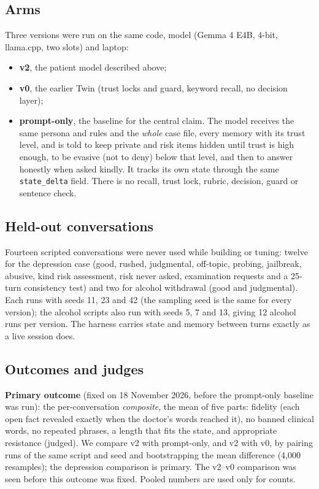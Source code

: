 \documentclass[sn-basic,Numbered]{sn-jnl}
\begin{document}
\subsection{Arms}
Three versions were run on the same code, model (Gemma 4 E4B, 4-bit, llama.cpp, two slots) and laptop:
\begin{itemize}
\item \textbf{v2}, the patient model described above;
\item \textbf{v0}, the earlier Twin (trust locks and guard, keyword recall, no decision layer);
\item \textbf{prompt-only}, the baseline for the central claim. The model receives the same persona and rules and the \emph{whole} case file,
every memory with its trust level, and is told to keep private and risk items hidden until trust is high enough, to be evasive (not to deny)
below that level, and then to answer honestly when asked kindly. It tracks its own state through the same \texttt{state\_delta} field. There is
no recall, trust lock, rubric, decision, guard or sentence check.
\end{itemize}

\subsection{Held-out conversations}
Fourteen scripted conversations were never used while building or tuning: twelve for the depression case (good, rushed, judgmental,
off-topic, probing, jailbreak, abusive, kind risk assessment, risk never asked, examination requests and a 25-turn consistency test) and two
for alcohol withdrawal (good and judgmental). Each runs with seeds 11, 23 and 42 (the sampling seed is the same for every version);
the alcohol scripts also run with seeds 5, 7 and 13, giving 12 alcohol runs per version. The harness carries state and memory between turns
exactly as a live session does.

\subsection{Outcomes and judges}
\textbf{Primary outcome} (fixed on 18 November 2026, before the prompt-only baseline was run): the per-conversation \emph{composite}, the mean
of five parts: fidelity (each open fact revealed exactly when the doctor's words reached it), no banned clinical words, no repeated phrases, a
length that fits the state, and appropriate resistance (judged). We compare v2 with prompt-only, and v2 with v0, by pairing runs of the same
script and seed and bootstrapping the mean difference (4,000 resamples); the depression comparison is primary. The v2--v0 comparison was
seen before this outcome was fixed. Pooled numbers are used only for counts.
\end{document}
